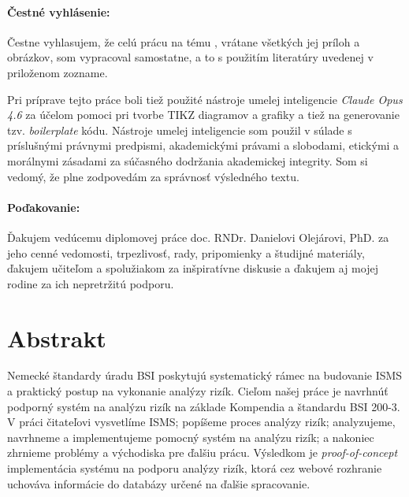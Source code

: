 \documentclass[12pt, twoside]{book}
\def\mfnazov{Systém na podporu analýzy rizík}
\begin{document}
\newpage 
\setcounter{page}{3}




\newpage 
\pagestyle{plain}
\paragraph{Čestné vyhlásenie:}
Čestne vyhlasujem, že celú prácu na tému \uv{\mfnazov},
vrátane všetkých jej príloh a obrázkov, som vypracoval
samostatne, a to s použitím literatúry uvedenej v priloženom zozname.

Pri príprave tejto práce boli tiež použité nástroje umelej inteligencie
\emph{Claude Opus 4.6} za účelom pomoci pri tvorbe TIKZ diagramov a grafiky a tiež na generovanie tzv. \emph{boilerplate} kódu.
Nástroje umelej inteligencie som použil v súlade s príslušnými právnymi
predpismi, akademickými právami a slobodami, etickými a morálnymi
zásadami za súčasného dodržania akademickej integrity. Som si
vedomý, že plne zodpovedám za správnosť výsledného textu.

\paragraph{Poďakovanie:} 
Ďakujem vedúcemu diplomovej práce doc. RNDr. Danielovi Olejárovi, PhD. za jeho cenné vedomosti, trpezlivosť, rady, pripomienky a študijné
materiály, ďakujem učiteľom a spolužiakom za inšpiratívne diskusie a ďakujem aj mojej rodine za ich nepretržitú podporu.
\newpage 
\section*{Abstrakt}

Nemecké štandardy úradu BSI poskytujú systematický rámec na budovanie ISMS a praktický postup na vykonanie analýzy rizík. Cieľom našej práce
je navrhnúť podporný systém na analýzu rizík na základe Kompendia a štandardu BSI 200-3. V práci čitateľovi vysvetlíme ISMS; popíšeme proces
analýzy rizík; analyzujeme, navrhneme a implementujeme pomocný systém na analýzu rizík; a nakoniec zhrnieme
problémy a východiska pre ďalšiu prácu. Výsledkom je \emph{proof-of-concept} implementácia systému na podporu analýzy rizík, ktorá cez webové
rozhranie uchováva informácie do databázy určené na ďalšie spracovanie. 
\end{document}
